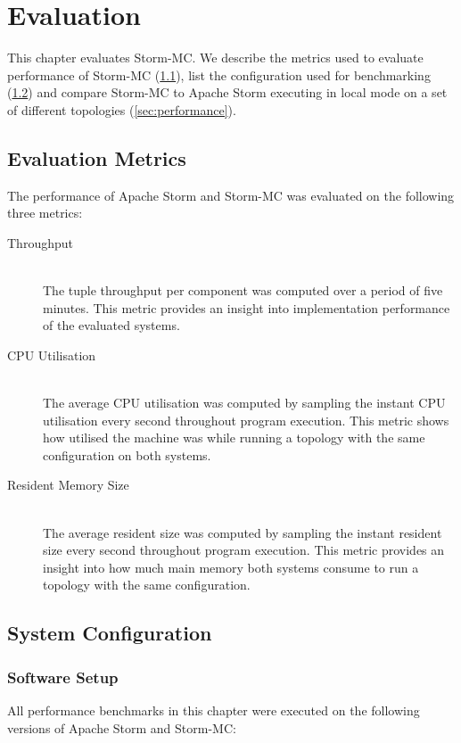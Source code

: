 \chapter{Evaluation}

This chapter evaluates Storm-MC. We describe the metrics used to evaluate performance of Storm-MC (\ref{sec:metrics}), list the configuration used for benchmarking (\ref{sec:system_conf}) and compare Storm-MC to Apache Storm executing in local mode on a set of different topologies (\ref{sec:performance}).

\section{Evaluation Metrics}
\label{sec:metrics}

The performance of Apache Storm and Storm-MC was evaluated on the following three metrics:

\begin{description}
	\item[Throughput] \hfill \\
	The tuple throughput per component was computed over a period of five minutes. This metric provides an insight into implementation performance of the evaluated systems.
	\item[CPU Utilisation] \hfill \\
	The average CPU utilisation was computed by sampling the instant CPU utilisation every second throughout program execution. This metric shows how utilised the machine was while running a topology with the same configuration on both systems.
	\item[Resident Memory Size] \hfill \\
	The average resident size was computed by sampling the instant resident size every second throughout program execution. This metric provides an insight into how much main memory both systems consume to run a topology with the same configuration.
\end{description}

\section{System Configuration}
\label{sec:system_conf}

\subsection{Software Setup}

All performance benchmarks in this chapter were executed on the following versions of Apache Storm and Storm-MC:

